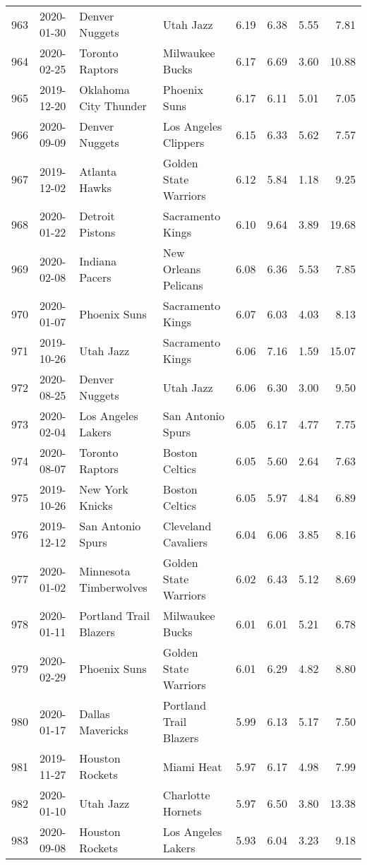 \documentclass[
  11pt,
]{article}
\theoremstyle{nonumberplain}
\begin{document}
\begin{longtable}{rl|llr|rrr}
963 & 2020-01-30 & Denver Nuggets & Utah Jazz & 6.19 & 6.38 & 5.55 & 7.81\\
964 & 2020-02-25 & Toronto Raptors & Milwaukee Bucks & 6.17 & 6.69 & 3.60 & 10.88\\
965 & 2019-12-20 & Oklahoma City Thunder & Phoenix Suns & 6.17 & 6.11 & 5.01 & 7.05\\
966 & 2020-09-09 & Denver Nuggets & Los Angeles Clippers & 6.15 & 6.33 & 5.62 & 7.57\\
967 & 2019-12-02 & Atlanta Hawks & Golden State Warriors & 6.12 & 5.84 & 1.18 & 9.25\\
968 & 2020-01-22 & Detroit Pistons & Sacramento Kings & 6.10 & 9.64 & 3.89 & 19.68\\
969 & 2020-02-08 & Indiana Pacers & New Orleans Pelicans & 6.08 & 6.36 & 5.53 & 7.85\\
970 & 2020-01-07 & Phoenix Suns & Sacramento Kings & 6.07 & 6.03 & 4.03 & 8.13\\
971 & 2019-10-26 & Utah Jazz & Sacramento Kings & 6.06 & 7.16 & 1.59 & 15.07\\
972 & 2020-08-25 & Denver Nuggets & Utah Jazz & 6.06 & 6.30 & 3.00 & 9.50\\
973 & 2020-02-04 & Los Angeles Lakers & San Antonio Spurs & 6.05 & 6.17 & 4.77 & 7.75\\
974 & 2020-08-07 & Toronto Raptors & Boston Celtics & 6.05 & 5.60 & 2.64 & 7.63\\
975 & 2019-10-26 & New York Knicks & Boston Celtics & 6.05 & 5.97 & 4.84 & 6.89\\
976 & 2019-12-12 & San Antonio Spurs & Cleveland Cavaliers & 6.04 & 6.06 & 3.85 & 8.16\\
977 & 2020-01-02 & Minnesota Timberwolves & Golden State Warriors & 6.02 & 6.43 & 5.12 & 8.69\\
978 & 2020-01-11 & Portland Trail Blazers & Milwaukee Bucks & 6.01 & 6.01 & 5.21 & 6.78\\
979 & 2020-02-29 & Phoenix Suns & Golden State Warriors & 6.01 & 6.29 & 4.82 & 8.80\\
980 & 2020-01-17 & Dallas Mavericks & Portland Trail Blazers & 5.99 & 6.13 & 5.17 & 7.50\\
981 & 2019-11-27 & Houston Rockets & Miami Heat & 5.97 & 6.17 & 4.98 & 7.99\\
982 & 2020-01-10 & Utah Jazz & Charlotte Hornets & 5.97 & 6.50 & 3.80 & 13.38\\
983 & 2020-09-08 & Houston Rockets & Los Angeles Lakers & 5.93 & 6.04 & 3.23 & 9.18\\

\end{longtable}
\end{document}
